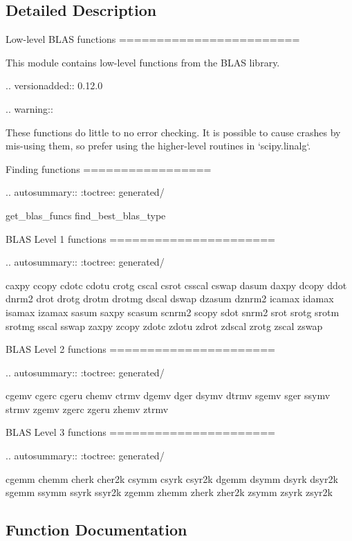 \subsection{Detailed Description}
\begin{DoxyVerb}Low-level BLAS functions
========================

This module contains low-level functions from the BLAS library.

.. versionadded:: 0.12.0

.. warning::

   These functions do little to no error checking.
   It is possible to cause crashes by mis-using them,
   so prefer using the higher-level routines in `scipy.linalg`.

Finding functions
=================

.. autosummary::
   :toctree: generated/

   get_blas_funcs
   find_best_blas_type

BLAS Level 1 functions
======================

.. autosummary::
   :toctree: generated/

    caxpy
    ccopy
    cdotc
    cdotu
    crotg
    cscal
    csrot
    csscal
    cswap
    dasum
    daxpy
    dcopy
    ddot
    dnrm2
    drot
    drotg
    drotm
    drotmg
    dscal
    dswap
    dzasum
    dznrm2
    icamax
    idamax
    isamax
    izamax
    sasum
    saxpy
    scasum
    scnrm2
    scopy
    sdot
    snrm2
    srot
    srotg
    srotm
    srotmg
    sscal
    sswap
    zaxpy
    zcopy
    zdotc
    zdotu
    zdrot
    zdscal
    zrotg
    zscal
    zswap

BLAS Level 2 functions
======================

.. autosummary::
   :toctree: generated/

    cgemv
    cgerc
    cgeru
    chemv
    ctrmv
    dgemv
    dger
    dsymv
    dtrmv
    sgemv
    sger
    ssymv
    strmv
    zgemv
    zgerc
    zgeru
    zhemv
    ztrmv

BLAS Level 3 functions
======================

.. autosummary::
   :toctree: generated/

    cgemm
    chemm
    cherk
    cher2k
    csymm
    csyrk
    csyr2k
    dgemm
    dsymm
    dsyrk
    dsyr2k
    sgemm
    ssymm
    ssyrk
    ssyr2k
    zgemm
    zhemm
    zherk
    zher2k
    zsymm
    zsyrk
    zsyr2k\end{DoxyVerb}
 

\subsection{Function Documentation}
\hypertarget{namespacescipy_1_1linalg_1_1blas_af00eb0abdb44c4e644e3f78f7735f309}{}
